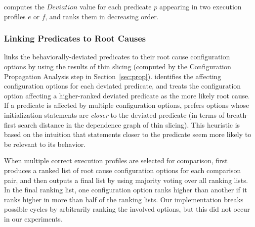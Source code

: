 \ourtool computes the $Deviation$ value for each predicate $p$
appearing in two execution profiles $e$ or $f$, and
ranks them in decreasing order. 







\subsubsection{Linking Predicates to Root Causes}
\label{sec:linking}


\ourtool links the behaviorally-deviated
predicates to their root cause configuration options
by using the results of thin slicing (computed by the Configuration Propagation
Analysis step in Section~\ref{sec:prop}).
\ourtool identifies 
the affecting configuration options for each deviated predicate,
and treats the configuration option
affecting a higher-ranked deviated predicate as the more likely
root cause. If a predicate is affected by multiple
configuration options, \ourtool prefers options whose initialization
statements are \textit{closer} to the
deviated predicate (in terms of breath-first search
distance in the dependence graph of thin slicing).
This heuristic is based on the intuition that statements closer to the
predicate seem more likely to be relevant to its behavior.



When multiple correct execution profiles are selected for comparison,
\ourtool first produces a ranked list of root cause
configuration options for each comparison pair, and then outputs
a final list by using majority voting over all ranking lists.
In the final ranking list, one configuration option ranks higher
than another if it ranks higher in more than half of the ranking lists.
Our implementation breaks possible cycles by arbitrarily ranking the
involved options, but this did not occur in our experiments. 

